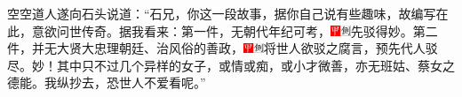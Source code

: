 空空道人遂向石头说道：``石兄，你这一段故事，据你自己说有些趣味，故编写在此，意欲问世传奇。据我看来：第一件，无朝代年纪可考，{\includegraphics[width=3mm]{../Images/00002}\includegraphics[width=3mm]{../Images/00011}\footnotesize 先驳得妙。}第二件，并无大贤大忠理朝廷、治风俗的善政，{\includegraphics[width=3mm]{../Images/00002}\includegraphics[width=3mm]{../Images/00011}\footnotesize 将世人欲驳之腐言，预先代人驳尽。妙！}其中只不过几个异样的女子，或情或痴，或小才微善，亦无班姑、蔡女之德能。我纵抄去，恐世人不爱看呢。''

